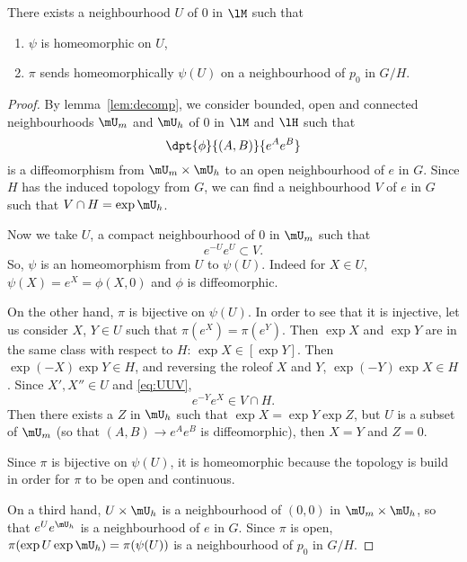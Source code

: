 \begin{lemma} \label{lem:vois_U}
There exists a neighbourhood $U$ of $0$ in $\lM$ such that
 \begin{enumerate}
 \item $\psi$ is homeomorphic on $U$,
 \item $\pi$ sends homeomorphically $\psi(U)$ on a neighbourhood of $p_0$ in $G/H$.
 \end{enumerate}
\end{lemma}

\begin{proof}
By lemma~\ref{lem:decomp}, we consider bounded, open and connected neighbourhoods $\mU_m$ and $\mU_h$ of $0$ in $\lM$ and $\lH$ such that
\[
  \dpt{\phi}{(A,B)}{e^Ae^B}
\]
is a diffeomorphism from $\mU_m\times\mU_h$ to an open neighbourhood of $e$ in $G$. Since $H$ has the induced topology from $G$, we can find a neighbourhood $V$ of $e$ in $G$ such that $V\cap H=\exp\mU_h$.

Now we take $U$, a compact neighbourhood of $0$ in $\mU_m$ such that
\begin{equation}\label{eq:UUV}
  e^{-U}e^{U}\subset V.
\end{equation}
So, $\psi$ is an homeomorphism from $U$ to $\psi(U)$. Indeed for $X\in U$, $\psi(X)=e^X=\phi(X,0)$ and $\phi$ is diffeomorphic.

On the other hand, $\pi$ is bijective on $\psi(U)$. In order to see that it is injective, let us consider $X$, $Y\in U$ such that $\pi(e^{X})=\pi(e^{Y})$. Then $\exp X$ and $\exp Y$ are in the same class with respect to $H$: $\exp X\in[\exp Y]$. Then $\exp(-X)\exp Y\in H$, and reversing the role\angl of $X$ and $Y$, $\exp(-Y)\exp X\in H$. Since $X',X''\in U$ and \eqref{eq:UUV},
\[
  e^{-Y}e^{X}\in V\cap H.
\]
Then there exists a $Z$ in $\mU_h$ such that $\exp X=\exp Y\exp Z$, but $U$ is a subset of $\mU_m$ (so that $(A,B)\to e^Ae^B$ is diffeomorphic), then $X=Y$ and $Z=0$.

Since $\pi$ is bijective on $\psi(U)$, it is homeomorphic because the topology is build in order for $\pi$ to be open and continuous.

On a third hand, $U\times\mU_h$ is a neighbourhood of $(0,0)$ in $\mU_m\times\mU_h$, so that $e^Ue^{\mU_h}$ is a neighbourhood of $e$ in $G$. Since $\pi$ is open, $\pi(\exp U\exp \mU_h)=\pi(\psi(U))$ is a neighbourhood of $p_0$ in $G/H$.
\end{proof}


